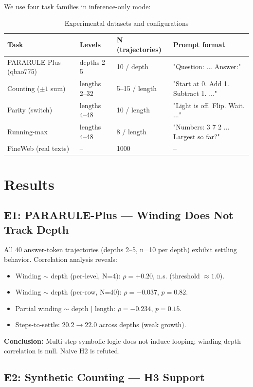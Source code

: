 \documentclass[12pt,a4paper]{article}
\begin{document}
We use four task families in inference-only mode:

\begin{table}[h]
\centering
\caption{Experimental datasets and configurations}
\begin{tabular}{llll}
\toprule
Task & Levels & N (trajectories) & Prompt format \\
\midrule
PARARULE-Plus (qbao775) & depths 2--5 & 10 / depth & "Question: ... Answer:" \\
Counting ($\pm1$ sum) & lengths 2--32 & 5--15 / length & "Start at 0. Add 1. Subtract 1. ..." \\
Parity (switch) & lengths 4--48 & 10 / length & "Light is off. Flip. Wait. ..." \\
Running-max & lengths 4--48 & 8 / length & "Numbers: 3 7 2 ... Largest so far?" \\
FineWeb (real texts) & -- & 1000 & -- \\
\bottomrule
\end{tabular}
\end{table}

\section{Results}

\subsection{E1: PARARULE-Plus — Winding Does Not Track Depth}

All 40 answer-token trajectories (depths 2--5, n=10 per depth) exhibit settling behavior. Correlation analysis reveals:

\begin{itemize}
    \item Winding $\sim$ depth (per-level, N=4): $\rho = +0.20$, n.s. (threshold $\approx 1.0$).
    \item Winding $\sim$ depth (per-row, N=40): $\rho = -0.037$, $p = 0.82$.
    \item Partial winding $\sim$ depth $|$ length: $\rho = -0.234$, $p = 0.15$.
    \item Steps-to-settle: $20.2 \rightarrow 22.0$ across depths (weak growth).
\end{itemize}

\textbf{Conclusion:} Multi-step symbolic logic does not induce looping; winding-depth correlation is null. Naive H2 is refuted.

\subsection{E2: Synthetic Counting — H3 Support}
\end{document}
